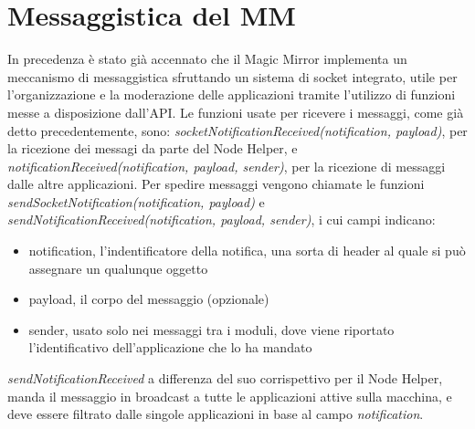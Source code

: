 \section{Messaggistica del MM}
In precedenza \`e stato gi\`a accennato che il Magic Mirror implementa un meccanismo di messaggistica sfruttando un sistema di socket integrato,
utile per l'organizzazione e la moderazione delle applicazioni tramite l'utilizzo di funzioni messe a disposizione dall'API.
Le funzioni usate per ricevere i messaggi, come gi\`a detto precedentemente, sono: \textit{socketNotificationReceived(notification, payload)},
per la ricezione dei messagi da parte del Node Helper, e \textit{notificationReceived(notification, payload, sender)}, per la ricezione di
messaggi dalle altre applicazioni.
Per spedire messaggi vengono chiamate le funzioni \textit{sendSocketNotification(notification, payload)} e \textit{sendNotificationReceived(notification, payload, sender)},
i cui campi indicano:
\begin{itemize}
\item notification, l'indentificatore della notifica, una sorta di header al quale si pu\`o assegnare un qualunque oggetto
\item payload, il corpo del messaggio (opzionale)
\item sender, usato solo nei messaggi tra i moduli, dove viene riportato l'identificativo dell'applicazione che lo ha mandato\\[1\baselineskip]
\end{itemize}
\textit{sendNotificationReceived} a differenza del suo corrispettivo per il Node Helper, manda il messaggio in broadcast a tutte le applicazioni attive
sulla macchina, e deve essere filtrato dalle singole applicazioni in base al campo \textit{notification}.
